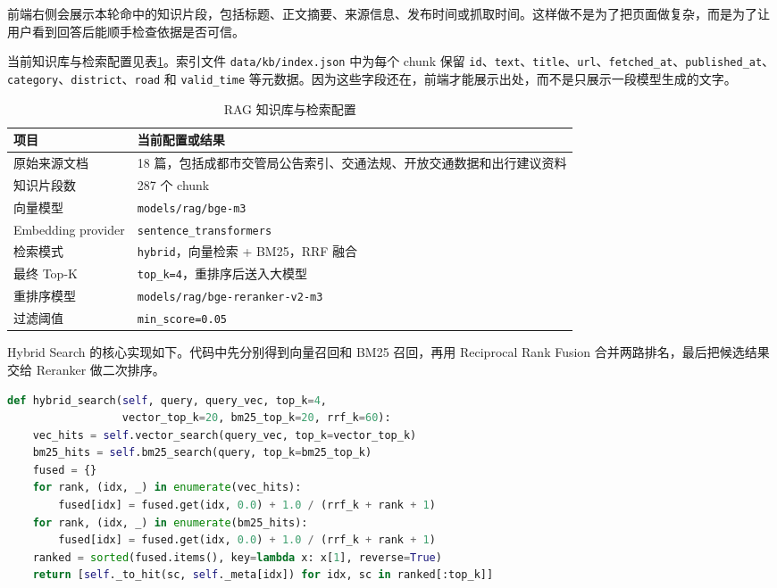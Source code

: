 \documentclass[bwprint]{report}
\begin{document}
前端右侧会展示本轮命中的知识片段，包括标题、正文摘要、来源信息、发布时间或抓取时间。这样做不是为了把页面做复杂，而是为了让用户看到回答后能顺手检查依据是否可信。

当前知识库与检索配置见表\ref{tab:rag-stats}。索引文件 \texttt{data/kb/index.json} 中为每个 chunk 保留 \texttt{id}、\texttt{text}、\texttt{title}、\texttt{url}、\texttt{fetched\_at}、\texttt{published\_at}、\texttt{category}、\texttt{district}、\texttt{road} 和 \texttt{valid\_time} 等元数据。因为这些字段还在，前端才能展示出处，而不是只展示一段模型生成的文字。

\begin{table}[H]
    \caption{RAG 知识库与检索配置}
    \label{tab:rag-stats}
    \centering
    \small
    \begin{tabular}{p{}p{}}
        \toprule[1.5pt]
        项目 & 当前配置或结果 \\
        \midrule[1pt]
        原始来源文档 & 18 篇，包括成都市交管局公告索引、交通法规、开放交通数据和出行建议资料 \\
        知识片段数 & 287 个 chunk \\
        向量模型 & \texttt{models/rag/bge-m3} \\
        Embedding provider & \texttt{sentence\_transformers} \\
        检索模式 & \texttt{hybrid}，向量检索 + BM25，RRF 融合 \\
        最终 Top-K & \texttt{top\_k=4}，重排序后送入大模型 \\
        重排序模型 & \texttt{models/rag/bge-reranker-v2-m3} \\
        过滤阈值 & \texttt{min\_score=0.05} \\
        \bottomrule[1.5pt]
    \end{tabular}
\end{table}

Hybrid Search 的核心实现如下。代码中先分别得到向量召回和 BM25 召回，再用 Reciprocal Rank Fusion 合并两路排名，最后把候选结果交给 Reranker 做二次排序。

\begin{lstlisting}[language=Python]
def hybrid_search(self, query, query_vec, top_k=4,
                  vector_top_k=20, bm25_top_k=20, rrf_k=60):
    vec_hits = self.vector_search(query_vec, top_k=vector_top_k)
    bm25_hits = self.bm25_search(query, top_k=bm25_top_k)
    fused = {}
    for rank, (idx, _) in enumerate(vec_hits):
        fused[idx] = fused.get(idx, 0.0) + 1.0 / (rrf_k + rank + 1)
    for rank, (idx, _) in enumerate(bm25_hits):
        fused[idx] = fused.get(idx, 0.0) + 1.0 / (rrf_k + rank + 1)
    ranked = sorted(fused.items(), key=lambda x: x[1], reverse=True)
    return [self._to_hit(sc, self._meta[idx]) for idx, sc in ranked[:top_k]]
\end{lstlisting}
\end{document}
